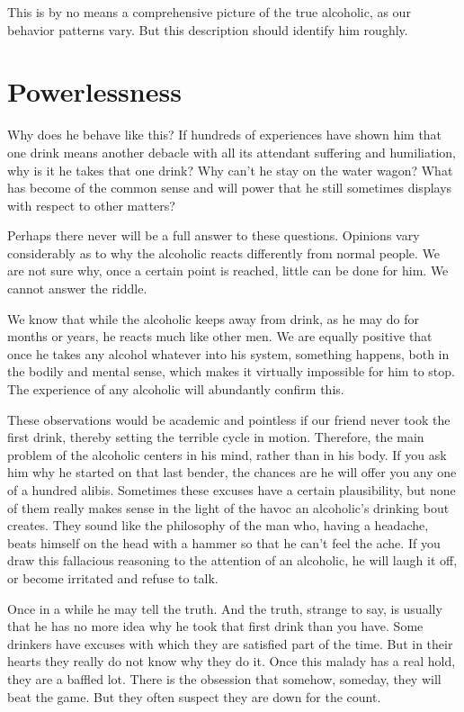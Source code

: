This is by no means a comprehensive picture of the true alcoholic, as our behavior patterns vary. 
But this description should identify him roughly.


\section{Powerlessness}

Why does he behave like this? 
If hundreds of experiences have shown him that one drink means another debacle with all its attendant suffering and humiliation, 
why is it he takes that one drink? 
Why can't he stay on the water wagon? 
What has become of the common sense and will power that he still sometimes displays with respect to other matters?

Perhaps there never will be a full answer to these questions. 
Opinions vary considerably as to why the alcoholic reacts differently from normal people. 
We are not sure why, once a certain point is reached, little can be done for him. 
We cannot answer the riddle.

We know that while the alcoholic keeps away from drink, as he may do for months or years, he reacts much like other men. 
We are equally positive that once he takes any alcohol whatever into his system, something happens, 
both in the bodily and mental sense, 
which makes it virtually impossible for him to stop. 
The experience of any alcoholic will abundantly confirm this.

These observations would be academic and pointless if our friend never took the first drink, thereby setting the terrible cycle in motion. 
Therefore, the main problem of the alcoholic centers in his mind, rather than in his body. 
If you ask him why he started on that last bender, the chances are he will offer you any one of a hundred alibis. 
Sometimes these excuses have a certain plausibility, 
but none of them really makes sense in the light of the havoc an alcoholic's drinking bout creates. 
They sound like the philosophy of the man who, having a headache, beats himself on the head with a hammer so that he can't feel the ache. 
If you draw this fallacious reasoning to the attention of an alcoholic, he will laugh it off, 
or become irritated and refuse to talk.

Once in a while he may tell the truth. 
And the truth, strange to say, is usually that he has no more idea why he took that first drink than you have. 
Some drinkers have excuses with which they are satisfied part of the time. 
But in their hearts they really do not know why they do it. 
Once this malady has a real hold, they are a baffled lot. 
There is the obsession that somehow, someday, they will beat the game. 
But they often suspect they are down for the count.

